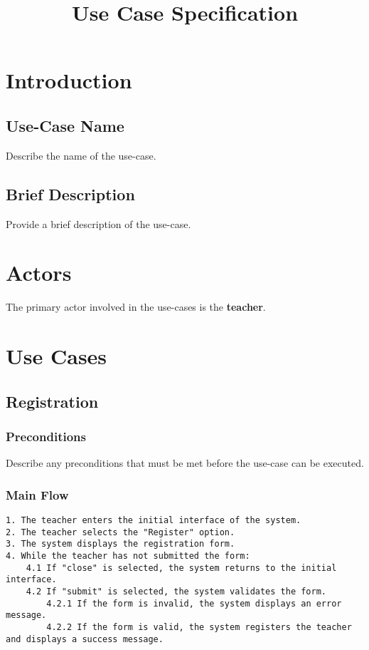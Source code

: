 \documentclass{article}
\title{Use Case Specification}
\author{}
\date{}
\begin{document}
\maketitle

\section{Introduction}
\subsection{Use-Case Name}
Describe the name of the use-case.

\subsection{Brief Description}
Provide a brief description of the use-case.

\section{Actors}
The primary actor involved in the use-cases is the \textbf{teacher}.

\section{Use Cases}
\subsection{Registration}
\subsubsection{Preconditions}
Describe any preconditions that must be met before the use-case can be executed.

\subsubsection{Main Flow}
\begin{verbatim}
1. The teacher enters the initial interface of the system.
2. The teacher selects the "Register" option.
3. The system displays the registration form.
4. While the teacher has not submitted the form:
    4.1 If "close" is selected, the system returns to the initial interface.
    4.2 If "submit" is selected, the system validates the form.
        4.2.1 If the form is invalid, the system displays an error message.
        4.2.2 If the form is valid, the system registers the teacher and displays a success message.
\end{verbatim}
\end{document}
